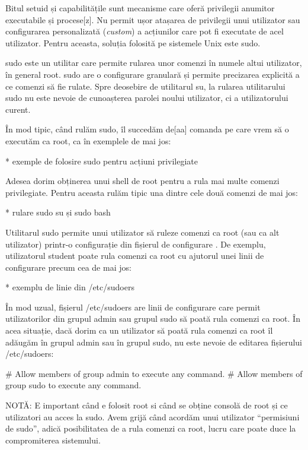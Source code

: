 Bitul setuid și capabilitățile sunt mecanisme care oferă privilegii anumitor
executabile și procese[z]. Nu permit ușor atașarea de privilegii unui utilizator
sau configurarea personalizată (\textit{custom}) a acțiunilor care pot fi
executate de acel utilizator. Pentru aceasta, soluția folosită pe sistemele Unix
este sudo.

sudo este un utilitar care permite rularea unor comenzi în numele altui
utilizator, în general root. sudo are o configurare granulară și permite
precizarea explicită a ce comenzi să fie rulate. Spre deosebire de utilitarul
su, la rularea utilitarului sudo nu este nevoie de cunoașterea parolei noului
utilizator, ci a utilizatorului curent.

În mod tipic, când rulăm sudo, îl succedăm de[aa] comanda pe care vrem să o
executăm ca root, ca în exemplele de mai jos:

* exemple de folosire sudo pentru acțiuni privilegiate

Adesea dorim obținerea unui shell de root pentru a rula mai multe comenzi
privilegiate. Pentru aceasta rulăm tipic una dintre cele două comenzi de mai
jos:

* rulare sudo su și sudo bash

Utilitarul sudo permite unui utilizator să ruleze comenzi ca root (sau ca alt
utilizator) printr-o configurație din fișierul de configurare
. De exemplu, utilizatorul student poate rula comenzi ca root
cu ajutorul unei linii de configurare precum cea de mai jos:

* exemplu de linie din /etc/sudoers

În mod uzual, fișierul /etc/sudoers are linii de configurare care permit
utilizatorilor din grupul admin sau grupul sudo să poată rula comenzi ca root.
În acea situație, dacă dorim ca un utilizator să poată rula comenzi ca root îl
adăugăm în grupul admin sau în grupul sudo, nu este nevoie de editarea
fișierului /etc/sudoers:

\begin{screen}
# Allow members of group admin to execute any command.
# Allow members of group sudo to execute any command.
\end{screen}

NOTĂ: E important când e folosit root si când se obține consolă de root și ce
utilizatori au acces la sudo. Avem grijă când acordăm unui utilizator
“permisiuni de sudo”, adică posibilitatea de a rula comenzi ca root, lucru care
poate duce la compromiterea sistemului.

